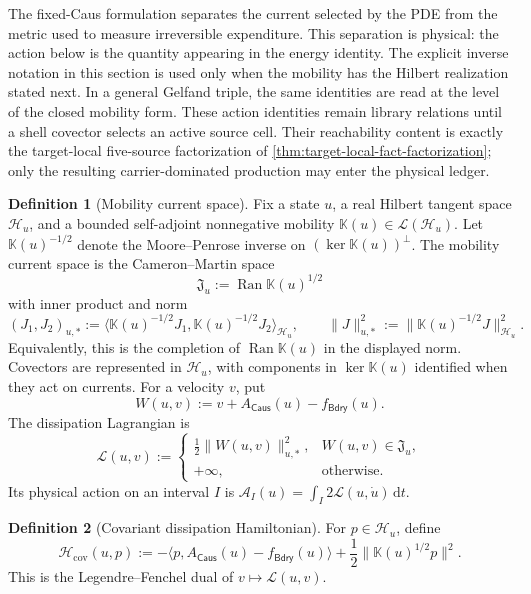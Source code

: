 \documentclass[11pt]{article}
\numberwithin{section}{part}
\theoremstyle{plain}
\theoremstyle{definition}
\newtheorem{definition}[definition]{Definition}
\theoremstyle{remark}
\newcommand{\dd}{\,\mathrm d}
\newcommand{\Caus}{\mathsf{Caus}}
\newcommand{\Bdry}{\mathsf{Bdry}}
\newcommand{\Action}{\mathcal A}
\newcommand{\Hspace}{\mathcal H}
\newcommand{\Ran}{\operatorname{Ran}}
\begin{document}
The fixed-Caus formulation separates the current selected by the PDE from
the metric used to measure irreversible expenditure.  This separation is
physical: the action below is the quantity appearing in the energy identity.
The explicit inverse notation in this section is used only when the mobility
has the Hilbert realization stated next.  In a general Gelfand triple, the
same identities are read at the level of the closed mobility form.
These action identities remain library relations until a shell covector
selects an active source cell.  Their reachability content is exactly the
target-local five-source factorization of
\cref{thm:target-local-fact-factorization}; only the resulting
carrier-dominated production may enter the physical ledger.

\begin{definition}[Mobility current space]
\label{def:mobility-current-space}
Fix a state \(u\), a real Hilbert tangent space \(\Hspace_u\), and a bounded
self-adjoint nonnegative mobility
\(\mathbb K(u)\in\mathcal L(\Hspace_u)\).  Let
\(\mathbb K(u)^{-1/2}\) denote the Moore--Penrose inverse on
\((\ker\mathbb K(u))^\perp\).  The mobility current space is the
Cameron--Martin space
\[
 \mathfrak J_u:=\Ran\mathbb K(u)^{1/2}
\]
with inner product and norm
\[
 (J_1,J_2)_{u,*}
 :=\bigl\langle\mathbb K(u)^{-1/2}J_1,
                  \mathbb K(u)^{-1/2}J_2\bigr\rangle_{\Hspace_u},
 \qquad
 \|J\|_{u,*}^2
 :=\bigl\|\mathbb K(u)^{-1/2}J\bigr\|_{\Hspace_u}^2.
\]
Equivalently, this is the completion of \(\Ran\mathbb K(u)\) in the
displayed norm.  Covectors are represented in \(\Hspace_u\), with components
in \(\ker\mathbb K(u)\) identified when they act on currents.
For a velocity \(v\), put
\[
 W(u,v):=v+A_{\Caus}(u)-f_{\Bdry}(u).
\]
The dissipation Lagrangian is
\begin{equation}
 \label{eq:dissipation-lagrangian}
 \mathscr L(u,v)
 :=\begin{cases}
 \frac12\|W(u,v)\|_{u,*}^2,&W(u,v)\in\mathfrak J_u,\\
 +\infty,&\text{otherwise}.
 \end{cases}
\end{equation}
Its physical action on an interval \(I\) is
\(\Action_I(u)=\int_I2\mathscr L(u,\dot u)\dd t\).
\end{definition}

\begin{definition}[Covariant dissipation Hamiltonian]
\label{def:covariant-dissipation-hamiltonian}
For \(p\in\Hspace_u\), define
\begin{equation}
 \label{eq:covariant-dissipation-hamiltonian}
 \mathscr H_{\mathrm{cov}}(u,p)
 :=-\langle p,A_{\Caus}(u)-f_{\Bdry}(u)\rangle
   +\frac12\|\mathbb K(u)^{1/2}p\|^2.
\end{equation}
This is the Legendre--Fenchel dual of
\(v\mapsto\mathscr L(u,v)\).
\end{definition}
\end{document}
